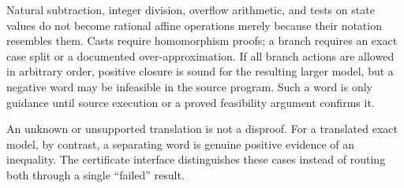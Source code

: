 Natural subtraction, integer division, overflow arithmetic, and tests on state
values do not become rational affine operations merely because their notation
resembles them. Casts require homomorphism proofs; a branch requires an exact
case split or a documented over-approximation. If all branch actions are allowed
in arbitrary order, positive closure is sound for the resulting larger model,
but a negative word may be infeasible in the source program. Such a word is only
guidance until source execution or a proved feasibility argument confirms it.

An unknown or unsupported translation is not a disproof. For a translated
exact model, by contrast, a separating word is genuine positive evidence of an
inequality. The certificate interface distinguishes these cases instead of
routing both through a single ``failed'' result.
